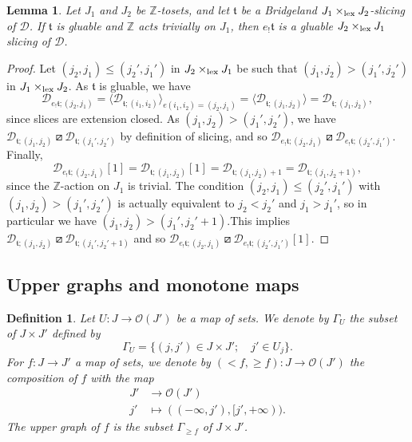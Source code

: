 \documentclass{article}
\newtheorem{lem}[thm]{Lemma}
\newtheorem{defn}[thm]{Definition}
\theoremstyle{definition}
\newcommand{\Z}{\mathbb{Z}}
\newcommand{\Oo}{\mathcal{O}}
\newcommand{\tee}{\mathfrak{t}}
\newcommand{\orth}{\boxslash}
\newcommand{\gr}{\Gamma}
\newcommand{\lex}{\times_{\textnormal{lex}}}
\begin{document}
\begin{lem}\label{incolla2}
Let $J_1$  and $J_2$ be $\Z$-tosets, and let $\tee$ be a Bridgeland $J_1 \lex J_2$-slicing of $\mathscr{D}$. If $\tee$ is gluable and $\Z$ acts trivially on $J_1$, then $e_! \tee$ is a gluable $J_2 \lex J_1$ slicing of $\mathscr{D}$. 
\end{lem}
\begin{proof}
Let $(j_2,j_1)\leq (j_2',j_1')$ in $J_2 \lex J_1$ be such that $(j_1,j_2)>(j_1',j_2')$ in $J_1 \lex J_2$. 
As $\tee$ is gluable, we have
\[
\mathscr{D}_{e_!\tee;(j_2,j_1)}=\langle \mathscr{D}_{\tee;(i_1,i_2)}\rangle_{e(i_1,i_2)=(j_2,j_1)}=\langle \mathscr{D}_{\tee;(j_1,j_2)}\rangle=\mathscr{D}_{\tee;(j_1,j_2)},
\]
since slices are extension closed. As $(j_1,j_2)>(j_1',j_2')$, we have $\mathscr{D}_{\tee;(j_1,j_2)}\orth \mathscr{D}_{\tee;(j_1',j_2')}$ by definition of slicing, and so $\mathscr{D}_{e_!\tee;(j_2,j_1)}\orth\mathscr{D}_{e_!\tee;(j_2',j_1')}$. Finally, 
\[
\mathscr{D}_{e_!\tee;(j_2,j_1)}[1]=\mathscr{D}_{\tee;(j_1,j_2)}[1]=\mathscr{D}_{\tee;(j_1,j_2)+1}=\mathscr{D}_{\tee;(j_1,j_2+1)},
\]
since the $\Z$-action on $J_1$ is trivial. The condition $(j_2,j_1)\leq (j_2',j_1')$ with $(j_1,j_2)>(j_1',j_2')$ is actually equivalent to $j_2<j_2'$ and $j_1>j_1'$, so in particular we have $(j_1,j_2)>(j_1',j_2'+1)$.This implies $\mathscr{D}_{\tee;(j_1,j_2)}\orth \mathscr{D}_{\tee;(j_1',j_2'+1)}$ and so $\mathscr{D}_{e_!\tee;(j_2,j_1)}\orth\mathscr{D}_{e_!\tee;(j_2',j_1')}[1]$.
\end{proof}

\subsection{Upper graphs and monotone maps}

\begin{defn}
Let $U\colon J \to \Oo(J')$ be a map of sets. We denote by $\gr_{U}$ the subset of $J\times J'$ defined by 
 $$\gr_U=\{ (j,j') \in J \times J'; \quad j' \in U_{j} \}.$$
 For $f\colon J\to J'$ a map of sets, we denote by $(<f,\geq f)\colon J \to \Oo(J')$ the composition of $f$ with the map
 \begin{align*}
 J'&\to \Oo(J')\\
 j'&\mapsto ((-\infty,j'),[j',+\infty)).
 \end{align*}
 The upper graph of $f$ is the subset $\gr_{\geq f}$ of $J\times J'$.
\end{defn}
  
\end{document}
